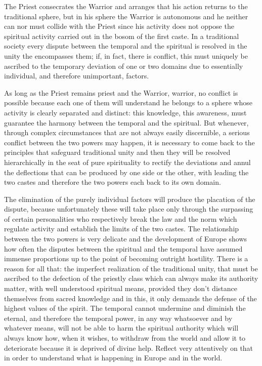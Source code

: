 The Priest consecrates the Warrior and arranges that his action returns to the traditional sphere, but in his sphere the Warrior is autonomous and he neither can nor must collide with the Priest since his activity does not oppose the spiritual activity carried out in the bosom of the first caste. In a traditional society every dispute between the temporal and the spiritual is resolved in the unity the encompasses them; if, in fact, there is conflict, this must uniquely be ascribed to the temporary deviation of one or two domains due to essentially individual, and therefore unimportant, factors.

As long as the Priest remains priest and the Warrior, warrior, no conflict is possible because each one of them will understand he belongs to a sphere whose activity is clearly separated and distinct: this knowledge, this awareness, must guarantee the harmony between the temporal and the spiritual. But whenever, through complex circumstances that are not always easily discernible, a serious conflict between the two powers may happen, it is necessary to come back to the principles that safeguard traditional unity and then they will be resolved hierarchically in the seat of pure spirituality to rectify the deviations and annul the deflections that can be produced by one side or the other, with leading the two castes and therefore the two powers each back to its own domain.

The elimination of the purely individual factors will produce the placation of the dispute, because unfortunately these will take place only through the surpassing of certain personalities who respectively break the law and the norm which regulate activity and establish the limits of the two castes. The relationship between the two powers is very delicate and the development of Europe shows how often the disputes between the spiritual and the temporal have assumed immense proportions up to the point of becoming outright hostility. There is a reason for all that: the imperfect realization of the traditional unity, that must be ascribed to the defection of the priestly class which can always make its authority matter, with well understood spiritual means, provided they don't distance themselves from sacred knowledge and in this, it only demands the defense of the highest values of the spirit. The temporal cannot undermine and diminish the eternal, and therefore the temporal power, in any way whatsoever and by whatever means, will not be able to harm the spiritual authority which will always know how, when it wishes, to withdraw from the world and allow it to deteriorate because it is deprived of divine help. Reflect very attentively on that in order to understand what is happening in Europe and in the world.

